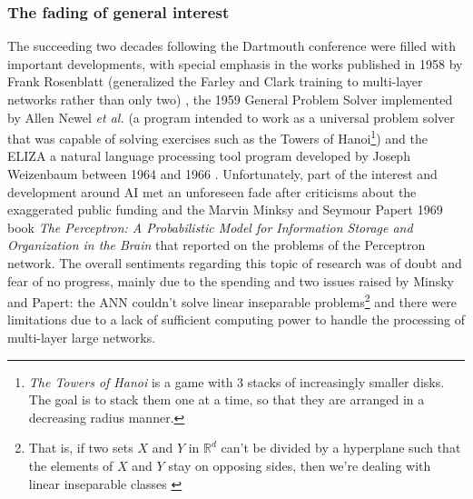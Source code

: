\documentclass[class=report, crop=false, a4paper, 12pt]{standalone}
\begin{document}
\subsubsection{The fading of general interest}
\par The succeeding two decades following the Dartmouth conference were filled with important developments, with special emphasis in the works published in 1958 by Frank Rosenblatt (generalized the Farley and Clark training to multi-layer networks rather than only two) \autocite{rosenblattPerceptronProbabilisticModel1958}, the 1959 General Problem Solver implemented by Allen Newel \textit{et al.} (a program intended to work as a universal problem solver that was capable of solving exercises such as the Towers of Hanoi\footnote{\textit{The Towers of Hanoi} is a game with 3 stacks of increasingly smaller disks. The goal is to stack them one at a time, so that they are arranged in a decreasing radius manner.}) \autocite{newell1959report} and the ELIZA a natural language processing tool program developed by Joseph Weizenbaum between 1964 and 1966 \autocite{weizenbaumELIZAComputerProgram1966}. Unfortunately, part of the interest and development around AI met an unforeseen fade after criticisms about the exaggerated public funding \autocite{haenleinBriefHistoryArtificial2019} and the Marvin Minksy and Seymour Papert 1969 book \textit{The Perceptron: A Probabilistic Model for Information Storage and Organization in the Brain} \autocite{minsky69perceptrons} that reported on the problems of the Perceptron network. The overall sentiments regarding this topic of research was of doubt and fear of no progress, mainly due to the spending and two issues raised by Minsky and Papert: the ANN couldn't solve linear inseparable problems\footnote{That is, if two sets $X$ and $Y$ in $\mathbb{R}^d$ can't be divided by a hyperplane such that the elements of $X$ and $Y$ stay on opposing sides, then we're dealing with linear inseparable classes \autocite{elizondoLinearSeparabilityProblem2006}} and there were limitations due to a lack of sufficient computing power to handle the processing of multi-layer large networks.
\end{document}
